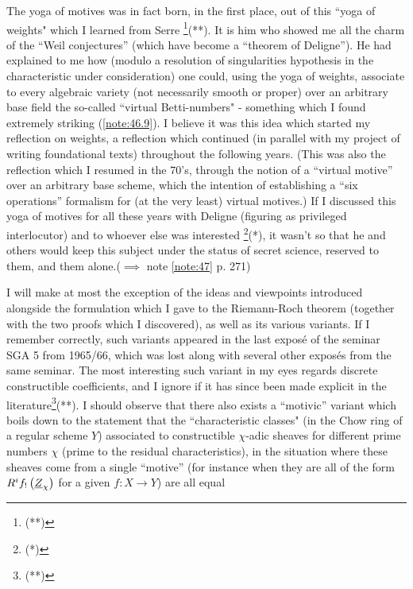 The yoga of motives was in fact born, in the first place, out of this ``yoga of weights"
which I learned from Serre
\footnote{(**)}(**).
It is him who showed me all the charm of the ``Weil conjectures'' (which have become
a ``theorem of Deligne''). 
He had explained to me how (modulo a resolution of singularities hypothesis in the
characteristic under consideration)
one could, using the yoga of weights, associate to every algebraic variety (not
necessarily smooth or proper) over an arbitrary base field 
the so-called ``virtual Betti-numbers" - something 
which I found extremely striking (\ref{note:46.9}).
I believe it was this idea which started my reflection on weights, a reflection which
continued (in parallel with my project of writing foundational texts)
throughout the following years. 
(This was also the reflection which I resumed in the 70's, through the notion of a ``virtual
motive'' over an arbitrary
base
scheme, which the intention of establishing a ``six operations'' formalism for (at the
very least) virtual motives.) If I discussed this yoga of motives for all these years with
Deligne (figuring as privileged interlocutor) and to whoever else was
interested
\footnote{(*)}(*),
it wasn't so that he and others would keep this subject under the status of secret
science, reserved to them, and them alone.($\implies$ note \ref{note:47} p. 271)


\label{note:46.1}

I will make at most the exception of the ideas and viewpoints introduced alongside the
formulation which I gave to the Riemann-Roch theorem (together with the two proofs which I
discovered), as well as its various variants. If I remember correctly, such variants
appeared in the last expos\'e of the seminar SGA 5 from 1965/66, which was lost along with
several other expos\'es from the same seminar. 
The most interesting such variant in my eyes regards discrete constructible coefficients, 
and I ignore if it has since been made explicit in the literature\footnote{(**)}(**).
I should observe that there also exists a ``motivic''
variant which boils down to the statement that the ``characteristic classes"
(in the Chow ring of a regular scheme $Y$) 
associated to constructible $\chi$-adic sheaves for different prime numbers $\chi$
(prime to the residual characteristics), in the situation where these sheaves come from a
single ``motive'' (for instance when they are all of the form
$R^if_!\left(\underline{Z}_\chi\right)$ for a given $f \colon X\to Y$) are all equal

